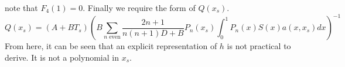 \documentclass[12pt]{article}
\begin{document}
note that $F_4(1)=0$.
Finally we require the form of $Q(x_s)$.
\begin{equation*}
Q(x_s) = (A+BT_s)\left(B\sum_{n\textrm{ even}}\frac{2n+1}{n(n+1)D+B}P_n(x_s)\int_0^1P_n(x)S(x)a(x,x_s)dx\right)^{-1}
\end{equation*}
From here, it can be seen that an explicit representation of $h$ is not practical to derive. It is not a polynomial in $x_s$.
\end{document}

